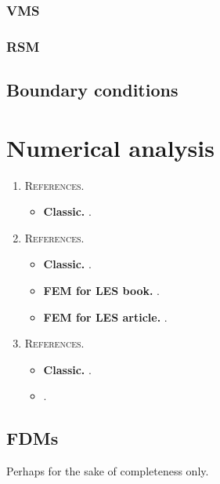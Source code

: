 \documentclass{book}
\numberwithin{equation}{section}
\begin{document}
\subsubsection{VMS}

\subsubsection{RSM}

\subsection{Boundary conditions}

\section{Numerical analysis}
\begin{enumerate}
    \item {}
    
    \textsc{References.}
    \begin{itemize}
        \item \textbf{Classic.} \cite{LeVeque2007}.
    \end{itemize}
    \item {}
    
    \textsc{References.}
    \begin{itemize}
        \item \textbf{Classic.} \cite{Brenner_Scott2008}.
        \item \textbf{FEM for LES book.} \cite{John2004}.
        \item \textbf{FEM for LES article.} \cite{John_Layton2002}.
    \end{itemize}
    \item {}
    
    \textsc{References.}
    \begin{itemize}
        \item \textbf{Classic.} \cite{LeVeque2002}.
        \item \cite{Moukalled_Mangani_Darwish2016}.
    \end{itemize}
\end{enumerate}

\subsection{FDMs}
Perhaps for the sake of completeness only.
\end{document}
